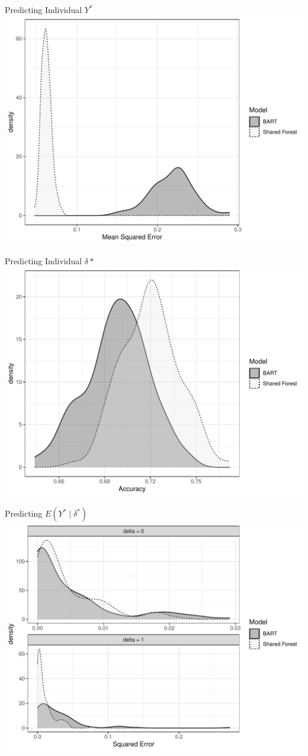 \documentclass{beamer}
\begin{document}
\begin{frame}{Predicting Individual $Y^*$ }
\includegraphics[width = .9\linewidth]{continuous_sim_results_ind_y.pdf}
\end{frame}


\begin{frame}{Predicting Individual $\delta*$}
\includegraphics[width = .9\linewidth]{continuous_sim_results_ind_delta.pdf}
\end{frame}


\begin{frame}{Predicting $E(Y^* \mid \delta^*)$ }
\includegraphics[width = .9\linewidth]{continuous_sim_results.pdf}
\end{frame}
\end{document}
